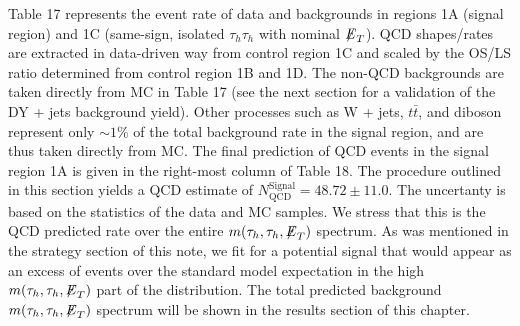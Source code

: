          
Table 17 represents the event rate of data and backgrounds in regions 1A (signal region) and 1C (same-sign, isolated $\tau_{h}\tau_{h}$ with nominal $\MET$). QCD 
shapes/rates are extracted in data-driven way from control region 1C and scaled by the OS/LS ratio determined from control region 1B and 1D. The non-QCD 
backgrounds are taken directly from MC in Table 17 (see the next section for a validation of the DY + jets background yield). Other processes such as W + jets, 
$t\bar{t}$, and diboson represent only $\sim 1$\% of the total background 
rate in the signal region, and are thus taken directly from MC. The final prediction of QCD events in the signal region 1A is given in the right-most column of 
Table 18. The procedure outlined in this section yields a QCD estimate of $N_{\textrm{QCD}}^{\textrm{Signal}} = 48.72 \pm 11.0$. The uncertanty is based on the 
statistics of the data and MC samples. We stress that this is the QCD predicted rate over the entire $m(\tau_{h},\tau_{h},{\not\mathrel{E}}_T)$ spectrum. As was mentioned
in the strategy section of this note, we fit for a potential signal that would appear as an excess of events over the standard model expectation in the high 
$m(\tau_{h},\tau_{h},{\not\mathrel{E}}_T)$ part of the distribution. The total predicted background $m(\tau_{h},\tau_{h},{\not\mathrel{E}}_T)$ spectrum will be shown in the results section of 
this chapter. 

\begin{table}[ht]
  \caption{Background and data yields in QCD control regions $A$ and $C$ under nominal isolation and $\MET$ conditions (i.e. isolated $+$ $\MET > 30$ GeV).}
  \label{table:CR3table}
\end{table}

